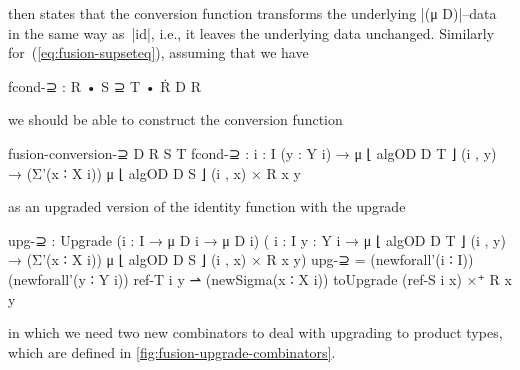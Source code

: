 then states that the conversion function transforms the underlying |(μ D)|--data in the same way as~|id|, i.e., it leaves the underlying data unchanged.
Similarly for~(\ref{eq:fusion-supseteq}), assuming that we have
\begin{code}
fcond-⊇ : R • S ⊇ T • Ṙ D R
\end{code}
we should be able to construct the conversion function
\begin{code}
fusion-conversion-⊇ D R S T fcond-⊇ :
  {i : I} (y : Y i) → μ ⌊ algOD D T ⌋ (i , y) →
  (Σ'(x ∶ X i)) μ ⌊ algOD D S ⌋ (i , x) × R x y
\end{code}
as an upgraded version of the identity function with the upgrade
\begin{code}
upg-⊇ : Upgrade  ({i : I} → μ D i → μ D i)
                 (  {i : I} {y : Y i} → μ ⌊ algOD D T ⌋ (i , y) →
                    (Σ'(x ∶ X i)) μ ⌊ algOD D S ⌋ (i , x) × R x y)
upg-⊇ =  (newforall'(i ∶ I)) (newforall'(y ∶ Y i)) ref-T i y ⇀
         (newSigma(x ∶ X i)) toUpgrade (ref-S i x) ×⁺ R x y
\end{code}
in which we need two new combinators to deal with upgrading to product types, which are defined in \autoref{fig:fusion-upgrade-combinators}.

